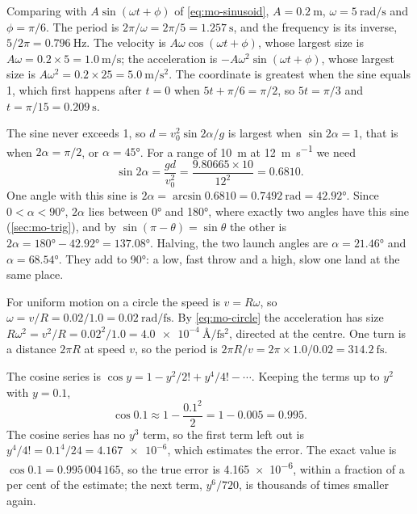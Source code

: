 Comparing with $A\sin(\omega t + \phi)$ of
\cref{eq:mo-sinusoid}, $A = \SI{0.2}{\metre}$, $\omega =
\SI{5}{\radian\per\second}$ and $\phi = \pi/6$. The period is $2\pi/\omega
= 2\pi/5 = \SI{1.257}{\second}$, and the frequency is its inverse,
$5/2\pi = \SI{0.796}{\hertz}$. The velocity is $A\omega\cos(\omega t +
\phi)$, whose largest size is $A\omega = 0.2\times5 =
\SI{1.0}{\metre\per\second}$; the acceleration is $-A\omega^2\sin(\omega t
+ \phi)$, whose largest size is $A\omega^2 = 0.2\times25 =
\SI{5.0}{\metre\per\second\squared}$. The coordinate is greatest when the
sine equals 1, which first happens after $t = 0$ when $5t + \pi/6 =
\pi/2$, so $5t = \pi/3$ and $t = \pi/15 = \SI{0.209}{\second}$.

The sine never exceeds 1, so $d = v_0^2\sin
2\alpha/g$ is largest when $\sin 2\alpha = 1$, that is when $2\alpha =
\pi/2$, or $\alpha = \ang{45}$. For a range of \SI{10}{\metre} at
\SI{12}{\metre\per\second} we need
\begin{equation*}
   \sin 2\alpha = \frac{gd}{v_0^2} = \frac{9.80665\times10}{12^2} = 0.6810 .
\end{equation*}
One angle with this sine is $2\alpha = \arcsin 0.6810 =
\SI{0.7492}{\radian} = \ang{42.92}$. Since $0 < \alpha < \ang{90}$,
$2\alpha$ lies between \ang{0} and \ang{180}, where exactly two angles
have this sine (\cref{sec:mo-trig}), and by $\sin(\pi - \theta) =
\sin\theta$ the other is $2\alpha = \ang{180} - \ang{42.92} = \ang{137.08}$. Halving, the two
launch angles are $\alpha = \ang{21.46}$ and $\alpha = \ang{68.54}$. They
add to \ang{90}: a low, fast throw and a high, slow one land at the same
place.

For uniform motion on a circle the speed is $v =
R\omega$, so $\omega = v/R = 0.02/1.0 = \SI{0.02}{\radian\per
\femto\second}$. By \cref{eq:mo-circle} the acceleration has size
$R\omega^2 = v^2/R = 0.02^2/1.0 = \SI{4.0e-4}{\angstrom\per\femto\second
\squared}$, directed at the centre. One turn is a distance $2\pi R$ at
speed $v$, so the period is $2\pi R/v = 2\pi\times1.0/0.02 =
\SI{314.2}{\femto\second}$.

The cosine series is $\cos y = 1 - y^2/2! +
y^4/4! - \dotsb$. Keeping the terms up to $y^2$ with $y = 0.1$,
\begin{equation*}
   \cos 0.1 \approx 1 - \frac{0.1^2}{2} = 1 - 0.005 = 0.995 .
\end{equation*}
The cosine series has no $y^3$ term, so the first term left out is
$y^4/4! = 0.1^4/24 = \num{4.167e-6}$, which
estimates the error. The exact value is $\cos 0.1 = 0.995\,004\,165$, so
the true error is \num{4.165e-6}, within a fraction of a per cent of the
estimate; the next term, $y^6/720$, is thousands of times smaller again.

